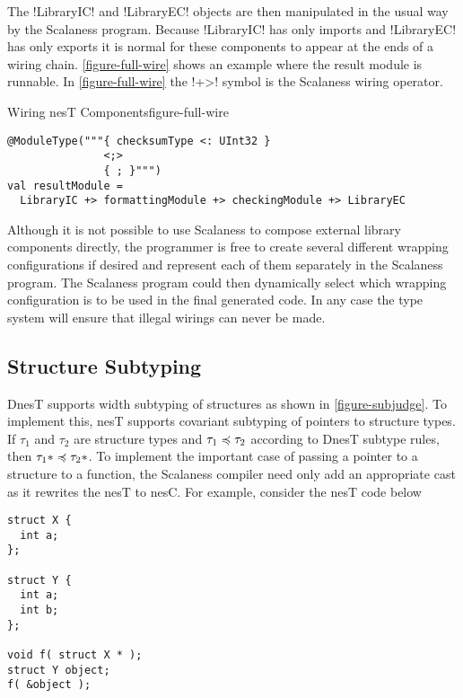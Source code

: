 The !LibraryIC! and !LibraryEC! objects are then manipulated in the usual way by the Scalaness
program. Because !LibraryIC! has only imports and !LibraryEC! has only exports it is normal for
these components to appear at the ends of a wiring chain. \autoref{figure-full-wire} shows an
example where the result module is runnable. In \autoref{figure-full-wire} the !+>! symbol is
the Scalaness wiring operator.

\singlespace
\begin{fpfig}[tbhp]{Wiring nesT Components}{figure-full-wire}
{
\begin{lstlisting}[language=scalaness]
@ModuleType("""{ checksumType <: UInt32 }
               <;>
               { ; }""")
val resultModule =
  LibraryIC +> formattingModule +> checkingModule +> LibraryEC
\end{lstlisting}
}
\end{fpfig}
\primaryspacing

Although it is not possible to use Scalaness to compose external library components directly,
the programmer is free to create several different wrapping configurations if desired and
represent each of them separately in the Scalaness program. The Scalaness program could then
dynamically select which wrapping configuration is to be used in the final generated code. In
any case the type system will ensure that illegal wirings can never be made.

\subsection{Structure Subtyping}
\label{section-structure-subtyping}


DnesT supports width subtyping of structures as shown in \autoref{figure-subjudge}. To implement
this, nesT supports covariant subtyping of pointers to structure types. If $\tau_1$ and $\tau_2$
are structure types and $\tau_1 \preccurlyeq \tau_2$ according to DnesT subtype rules, then $\tau_1*
\preccurlyeq \tau_2*$. To implement the important case of passing a pointer to a structure to a
function, the Scalaness compiler need only add an appropriate cast as it rewrites the nesT to
nesC. For example, consider the nesT code below

\singlespace
\vspace{1.0ex}
\begin{lstlisting}[language=nesC]
struct X {
  int a;
};

struct Y {
  int a;
  int b;
};

void f( struct X * );
struct Y object;
f( &object );
\end{lstlisting}
\vspace{1.0ex}
\primaryspacing

